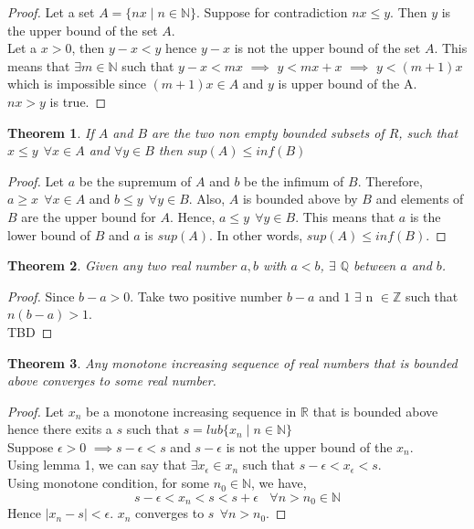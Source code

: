 \documentclass[12pt]{report}
\newtheorem{thm}{Theorem}
\begin{document}
\begin{proof}
    Let a set $A = \{nx \mid n \in \mathbb{N}\}$. Suppose for contradiction $ nx \leq y$. Then $y$ is the upper bound of the set $A$. \\
    Let a $x > 0$, then $ y - x < y$ hence $y - x$ is not the upper bound of the set $A$. This means that $\exists m \in \mathbb{N}$ such that $y - x < mx$ $\implies$ $y < mx + x$ $\implies$ $y < (m+1)x$ which is impossible since $(m+1)x \in A$ and $y$ is upper bound of the A.\\
    $ nx > y$ is true.
\end{proof}
\begin{thm}
    If $A$ and $B$ are the two non empty bounded subsets of $R$, such that $x \leq y ~~ \forall x \in A$ and $\forall y \in B$ then $sup(A) \leq inf(B)$
\end{thm}
\begin{proof}
    Let $a$ be the supremum of $A$ and $b$ be the infimum of $B$. Therefore, \linebreak $a \geq x~~\forall x \in A$ and $ b \leq y~~ \forall y \in B$. Also, $A$ is bounded above by $B$ and elements of $B$ are the upper bound for $A$. Hence, $a \leq y ~~ \forall y \in B$. This means that $a$ is the lower bound of $B$ and $a$ is $sup(A)$. In other words, $sup(A) \leq inf(B)$. 
\end{proof}
\begin{thm}
    Given any two real number $a,b$ with $a<b$, $\exists$ $\mathbb{Q}$ between $a$ and $b$.
\end{thm}
\begin{proof}
    Since $b-a > 0$. Take two positive number $b-a$ and $1$ $\exists$ n $\in \mathbb{Z}$ such that $n(b-a) > 1$.\\ TBD
\end{proof}
\begin{thm}
    Any monotone increasing sequence of real numbers that is bounded above converges to some real number.
\end{thm}
\begin{proof}
    Let $x_n$ be a monotone increasing sequence in $\mathbb{R}$ that is bounded above hence there exits a $s$ such that $s = lub\{x_n \mid n \in \mathbb{N}\}$ \\
    Suppose $\epsilon > 0$ $\implies s - \epsilon < s$ and $s - \epsilon$ is not the upper bound of the $x_n$.\\ 
    Using lemma 1, we can say that $\exists x_\epsilon \in x_n$ such that $s - \epsilon < x_\epsilon < s$.\\
    Using monotone condition, for some $n_0 \in \mathbb{N}$, we have,
    $$ s - \epsilon < x_n < s < s + \epsilon~~~~\forall n > n_0 \in \mathbb{N}$$ Hence $ |x_n - s| < \epsilon$. $x_n$ converges to $s~~\forall n > n_0.$ 
\end{proof}
\end{document}
